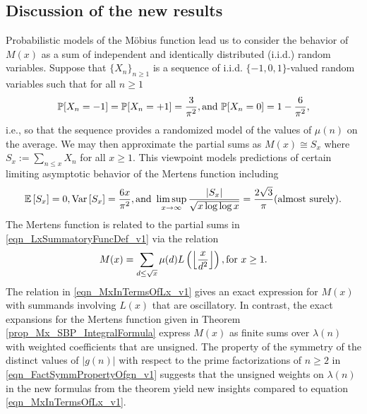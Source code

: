 \documentclass[11pt,reqno,a4letter]{article}
\newcommand{\hlocalref}[1]{\hyperref[#1]{\ref{#1}}}
\numberwithin{equation}{section}
\numberwithin{figure}{section}
\numberwithin{table}{section}
\newcommand{\Floor}[2]{\ensuremath{\left\lfloor \frac{#1}{#2} \right\rfloor}}
\theoremstyle{plain}
\numberwithin{theorem}{section}
\theoremstyle{definition}
\theoremstyle{remark}
\newcommand{\mathtext}[1]{\text{\rm #1}}
\begin{document}
\subsection{Discussion of the new results}

Probabilistic models of the M\"obius function lead us to consider the behavior of $M(x)$ 
as a sum of independent and identically distributed (i.i.d.) random variables. 
Suppose that $\{X_n\}_{n \geq 1}$ is a sequence of i.i.d. 
$\{-1,0,1\}$-valued random variables 
such that for all $n \geq 1$ 
$$\mathbb{P}[X_n = -1] = \mathbb{P}[X_n = +1] = \frac{3}{\pi^2}, 
  \mathtext{ and } \mathbb{P}[X_n = 0] = 1 - \frac{6}{\pi^2},$$ 
i.e., so that the sequence provides a randomized model of the values of $\mu(n)$ on the average. 
We may then approximate the partial sums as 
$M(x) \cong S_x$ where $S_x := \sum_{n \leq x} X_n$ for all $x \geq 1$. 
This viewpoint models predictions of certain limiting asymptotic behavior of the 
Mertens function including \cite[Thm.~9.4; \S 9]{BILLINGSLY-PROB-AND-MEASURE-BOOK}
\[
\mathbb{E}\left[S_x\right] = 0, 
     \operatorname{Var}\left[S_x\right] = \frac{6x}{\pi^2}, 
     \mathtext{ and } 
     \limsup_{x \rightarrow \infty} \frac{\left\lvert S_x\right\rvert}{\sqrt{x \log\log x}} = 
     \frac{2\sqrt{3}}{\pi} \mathtext{ (almost surely).} 
\]
The Mertens function is related to the partial sums in 
\eqref{eqn_LxSummatoryFuncDef_v1} 
via the relation \cite{HUMPHRIES-JNT-2013,LEHMAN-1960} 
\begin{equation}
\label{eqn_MxInTermsOfLx_v1} 
M(x) = \sum_{d \leq \sqrt{x}} \mu(d) L\left(\Floor{x}{d^2}\right), \mathtext{ for } x \geq 1.
\end{equation}
The relation in \eqref{eqn_MxInTermsOfLx_v1} 
gives an exact expression for $M(x)$ with summands involving $L(x)$ that are oscillatory. 
In contrast, the exact expansions for the Mertens function given in 
Theorem \hlocalref{prop_Mx_SBP_IntegralFormula} 
express $M(x)$ as finite sums over $\lambda(n)$ with weighted coefficients that are unsigned. 
The property of the symmetry of the distinct values of $|g(n)|$ with respect to the 
prime factorizations of $n \geq 2$ in \eqref{eqn_FactSymmPropertyOfgn_v1} 
suggests that the unsigned weights on $\lambda(n)$ in 
the new formulas from the theorem yield new insights compared to 
equation \eqref{eqn_MxInTermsOfLx_v1}. 
\end{document}
